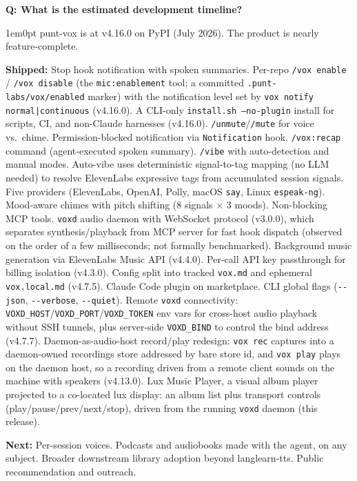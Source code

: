 \documentclass[11pt,letterpaper]{article}
\newcounter{faqnum}
\newenvironment{faqpair}[1]{%
  \needspace{4\baselineskip}%
  \vspace{0.5em}%
  \refstepcounter{faqnum}%
  \noindent\textbf{\color{SectionBlue}Q\thefaqnum: #1}\par\nopagebreak[4]%
  \vspace{0.2em}%
  \begin{adjustwidth}{1em}{0pt}%
  \setlength{\parindent}{0pt}%
}{%
  \end{adjustwidth}%
  \vspace{0.5em}%
}
\begin{document}
\begin{faqpair}{What is the estimated development timeline?}\label{faq:timeline}
  punt-vox is at v4.16.0 on PyPI (July 2026). The product is nearly
  feature-complete.

  \textbf{Shipped:} Stop hook notification with spoken summaries.
  Per-repo \texttt{/vox enable} / \texttt{/vox disable} (the \texttt{mic:enablement}
  tool; a committed \texttt{.punt-labs/vox/enabled} marker) with the
  notification level set by \texttt{vox notify normal|continuous} (v4.16.0).
  A CLI-only \texttt{install.sh --no-plugin} install for scripts, CI, and
  non-Claude harnesses (v4.16.0). \texttt{/unmute}/\texttt{/mute} for voice
  vs.\ chime. Permission-blocked notification via \texttt{Notification}
  hook. \texttt{/vox:recap} command (agent-executed spoken summary).
  \texttt{/vibe} with auto-detection and manual modes. Auto-vibe uses
  deterministic signal-to-tag mapping (no LLM needed) to resolve
  ElevenLabs expressive tags from accumulated session signals.
  Five providers (ElevenLabs, OpenAI, Polly, macOS \texttt{say}, Linux
  \texttt{espeak-ng}). Mood-aware chimes with pitch shifting
  (8 signals $\times$ 3 moods). Non-blocking MCP tools.
  \texttt{voxd} audio daemon with WebSocket protocol (v3.0.0), which
  separates synthesis/playback from MCP server for fast hook dispatch
  (observed on the order of a few milliseconds; not formally benchmarked).
  Background music generation via ElevenLabs Music API (v4.4.0).
  Per-call API key passthrough for billing isolation (v4.3.0).
  Config split into tracked \texttt{vox.md} and ephemeral
  \texttt{vox.local.md} (v4.7.5).
  Claude Code plugin on marketplace. CLI global flags
  (\texttt{-{}-json}, \texttt{-{}-verbose}, \texttt{-{}-quiet}).
  Remote \texttt{voxd} connectivity:
  \texttt{VOXD\_HOST}/\texttt{VOXD\_PORT}/\texttt{VOXD\_TOKEN} env vars
  for cross-host audio playback without SSH tunnels, plus server-side
  \texttt{VOXD\_BIND} to control the bind address (v4.7.7).
  Daemon-as-audio-host record/play redesign: \texttt{vox rec} captures into
  a daemon-owned recordings store addressed by bare store id, and \texttt{vox
  play} plays on the daemon host, so a recording driven from a remote client
  sounds on the machine with speakers (v4.13.0).
  Lux Music Player, a visual album player projected to a co-located lux
  display: an album list plus transport controls (play/pause/prev/next/stop),
  driven from the running \texttt{voxd} daemon (this release).

  \textbf{Next:} Per-session voices. Podcasts and audiobooks made with the agent, on any
  subject. Broader downstream library adoption beyond langlearn-tts. Public
  recommendation and outreach.
\end{faqpair}
\end{document}
